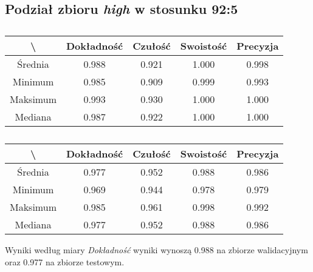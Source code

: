 \subsection{Podział zbioru \textit{high} w stosunku 92:5}
\label{sec:highsplita}


\begin{table}[H]
	\centering
	\caption{}
	\vspace{6pt}
	{\footnotesize
		\begin{tabular}{|c|c|c|c|c|}
      \hline \textbackslash & Dokładność & Czułość & Swoistość & Precyzja \\
      \hline Średnia & 0.988 & 0.921 & 1.000 & 0.998 \\
      \hline Minimum & 0.985 & 0.909 & 0.999 & 0.993 \\
      \hline Maksimum & 0.993 & 0.930 & 1.000 & 1.000 \\
      \hline Mediana & 0.987 & 0.922 & 1.000 & 1.000 \\
      \hline
    \end{tabular}
    \label{Tab:highsplita_val}
	}
	\vspace{0pt}
\end{table}

\begin{table}[H]
	\centering
	\caption{}
	\vspace{6pt}
	{\footnotesize
		\begin{tabular}{|c|c|c|c|c|}
      \hline \textbackslash & Dokładność & Czułość & Swoistość & Precyzja \\
      \hline Średnia & 0.977 & 0.952 & 0.988 & 0.986 \\
      \hline Minimum & 0.969 & 0.944 & 0.978 & 0.979 \\
      \hline Maksimum & 0.985 & 0.961 & 0.998 & 0.992 \\
      \hline Mediana & 0.977 & 0.952 & 0.988 & 0.986 \\
      \hline
    \end{tabular}
    \label{Tab:highsplita_test}
	}
	\vspace{0pt}
\end{table}

Wyniki według miary \textit{Dokładność} wyniki wynoszą 0.988 na zbiorze walidacyjnym oraz 0.977 na zbiorze testowym.
